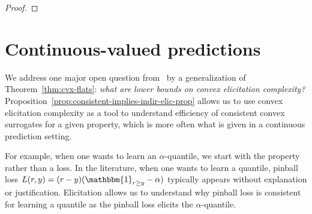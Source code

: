 \documentclass{article}
\newcommand{\reals}{\mathbb{R}}
\newcommand{\simplex}{\Delta_\Y}
\newcommand{\prop}[1]{\mathrm{prop}[#1]}
\newcommand{\R}{\mathcal{R}}
\renewcommand{\S}{\mathcal{S}}
\newcommand{\Y}{\mathcal{Y}}
\begin{document}
\begin{proof}
	
%	
%
\end{proof}




\section{Continuous-valued predictions}\label{sec:contin-consis}

We address one major open question from~\cite{frongillo2018elicitation} by a generalization of Theorem~\ref{thm:cvx-flats}: \emph{what are lower bounds on convex elicitation complexity?}
Proposition~\ref{prop:consistent-implies-indir-elic-prop} allows us to use convex elicitation complexity as a tool to understand efficiency of consistent convex surrogates for a given property, which is more often what is given in a continuous prediction setting.

For example, when one wants to learn an $\alpha$-quantile, we start with the property rather than a loss.
In the literature, when one wants to learn a quantile, pinball loss $L(r,y) = (r-y)(\mathbbm{1}_{r \geq y} - \alpha)$ typically appears without explanation or justification.
Elicitation allows us to understand why pinball loss is consistent for learning a quantile as the pinball loss elicits the $\alpha$-quantile.
\end{document}
